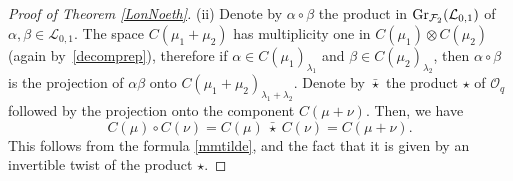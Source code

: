 \documentclass[10pt,a4paper]{amsart}
\numberwithin{equation}{section}
\theoremstyle{definition}
\newcommand{\Ll}{{\mathcal L}}
\newcommand{\Oo}{{\mathcal O}}
\begin{document}
\begin{proof}[Proof of Theorem \ref{LonNoeth}]
(ii) Denote by $\alpha \circ \beta$ the product in $ {\rm Gr}_{{\mathcal F}_2}({\mathcal L}_{0,1})$ of $\alpha,\beta\in \Ll_{0,1}$. The space $C(\mu_1+\mu_2)$ has multiplicity one in $C(\mu_1)\otimes C(\mu_2)$ (again by~\eqref{decomprep}), therefore if $\alpha \in C(\mu_1)_{\lambda_1}$ and $\beta \in C(\mu_2)_{\lambda_2}$, then $\alpha \circ \beta$ is the projection of $\alpha \beta$ onto $C(\mu_1+\mu_2)_{\lambda_1+\lambda_2}$.
 Denote by $\bar{\star}$ the product $\star$ of $\Oo_q$ followed by the projection onto the component $C(\mu + \nu)$. Then, we have
\begin{equation}\label{filtration=}
C(\mu) \circ C(\nu) = C(\mu)\ \bar{\star} \ C(\nu) = C(\mu + \nu).
\end{equation}
This follows from the formula \eqref{mmtilde}, and the fact that it is given by an invertible twist of the product $\star$.


\end{proof}
\end{document}
